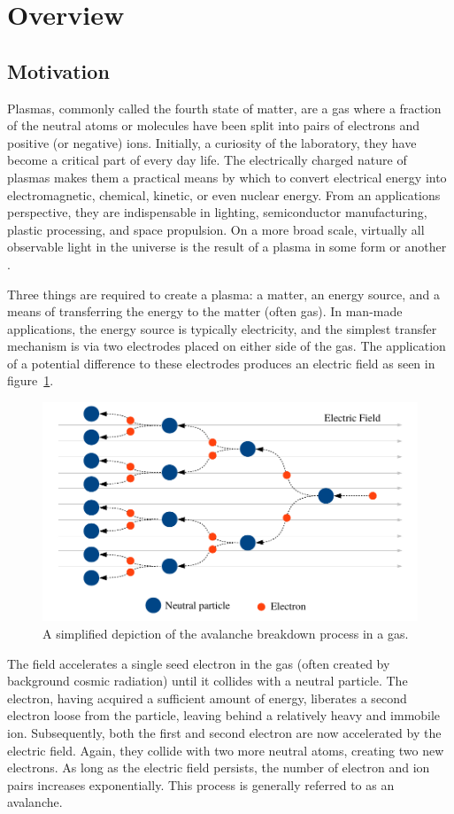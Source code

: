 \section{Overview}

\subsection{Motivation}
Plasmas, commonly called the fourth state of matter, are a gas where a fraction
of the neutral atoms or molecules have been split into pairs of electrons and
positive (or negative) ions. Initially, a curiosity of the laboratory, they have
become a critical part of every day life. The electrically charged nature of
plasmas makes them a practical means by which to convert electrical energy into
electromagnetic, chemical, kinetic, or even nuclear energy. From an applications
perspective, they are indispensable in lighting, semiconductor manufacturing,
plastic processing, and space propulsion. On a more broad scale, virtually all
observable light in the universe is the result of a plasma in some form or
another \cite{NA2007}.

Three things are required to create a plasma: a matter, an energy source, and a
means of transferring the energy to the matter (often gas). In man-made
applications, the energy source is typically electricity, and the simplest
transfer mechanism is via two electrodes placed on either side of the gas. The
application of a potential difference to these electrodes produces an electric
field as seen in figure~\ref{fig:avalanche}.
\begin{figure}
  \centering
  \includegraphics{./chapters/introduction/figures/avalanche.pdf}
  \caption{A simplified depiction of the avalanche breakdown process in a gas.}
  \label{fig:avalanche}
\end{figure}
The field accelerates a single seed electron in the gas (often created by
background cosmic radiation) until it collides with a neutral particle. The
electron, having acquired a sufficient amount of energy, liberates a second
electron loose from the particle, leaving behind a relatively heavy and immobile
ion. Subsequently, both the first and second electron are now accelerated by the
electric field. Again, they collide with two more neutral atoms, creating two
new electrons. As long as the electric field persists, the number of electron
and ion pairs increases exponentially. This process is generally referred to as
an avalanche.

